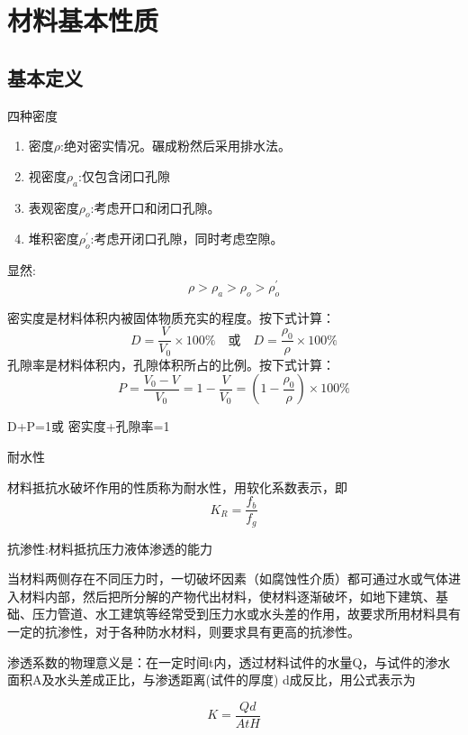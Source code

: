 \documentclass[12pt, a4paper, oneside, UTF8]{ctexbook}
\begin{document}
% 
\else
\fi

\chapter{材料基本性质}
\section{基本定义}

\begin{definition}
    四种密度
    \begin{enumerate}
        \item 密度$\rho$:绝对密实情况。碾成粉然后采用排水法。
        \item 视密度$\rho_a$:仅包含闭口孔隙
        \item 表观密度$\rho_o$:考虑开口和闭口孔隙。
        \item 堆积密度$\rho_o^{\prime}$:考虑开闭口孔隙，同时考虑空隙。
    \end{enumerate}
    显然:
    \[
    \rho>\rho_a>\rho_o>\rho_o^{\prime}
    \]
\end{definition}

密实度是材料体积内被固体物质充实的程度。按下式计算：
$$
D = \frac{V}{V_0} \times 100\% \quad \text{或} \quad D = \frac{\rho_0}{\rho} \times 100\%
$$
孔隙率是材料体积内，孔隙体积所占的比例。按下式计算：
$$
P = \frac{V_0 - V}{V_0} = 1 - \frac{V}{V_0} = \left(1 - \frac{\rho_0}{\rho}\right) \times 100\%
$$

\begin{remark}
    D+P=1或 密实度+孔隙率=1
\end{remark}

\begin{definition}
    耐水性

材料抵抗水破坏作用的性质称为耐水性，用软化系数表示，即
\[ K_R = \frac{f_b}{f_g} \]
\end{definition}

\begin{definition}
    抗渗性:材料抵抗压力液体渗透的能力

当材料两侧存在不同压力时，一切破坏因素（如腐蚀性介质）都可通过水或气体进入材料内部，然后把所分解的产物代出材料，使材料逐渐破坏，如地下建筑、基础、压力管道、水工建筑等经常受到压力水或水头差的作用，故要求所用材料具有一定的抗渗性，对于各种防水材料，则要求具有更高的抗渗性。
\end{definition}

\begin{definition}
    渗透系数的物理意义是：在一定时间t内，透过材料试件的水量Q，与试件的渗水面积A及水头差成正比，与渗透距离(试件的厚度) d成反比，用公式表示为

\[ K = \frac{Qd}{AtH} \]
\end{definition}
\end{document}
